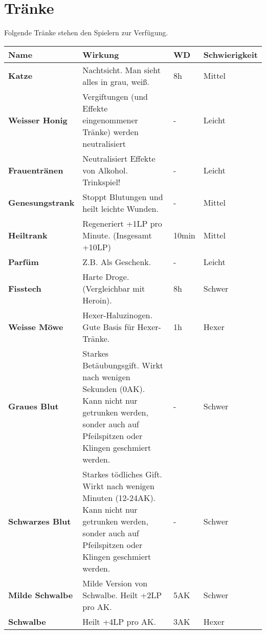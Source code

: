 \section{Tränke}
Folgende Tränke stehen den Spielern zur Verfügung. 

\begin{tabular}{|p{3.5cm}|p{7cm}|p{1.5cm}|p{3cm}|}
\hline
\textbf{Name} & \textbf{Wirkung} & \textbf{WD} & \textbf{Schwierigkeit} \\

\hline
\textbf{Katze} & Nachtsicht. Man sieht alles in grau, weiß. & 8h & Mittel \\

\hline
\textbf{Weisser Honig} & Vergiftungen (und Effekte eingenommener Tränke) werden neutralisiert & - & Leicht \\

\hline
\textbf{Frauentränen} & Neutralisiert Effekte von Alkohol. Trinkspiel! & - & Leicht \\

\hline
\textbf{Genesungstrank} & Stoppt Blutungen und heilt leichte Wunden. & - & Mittel \\

\hline
\textbf{Heiltrank} & Regeneriert +1LP pro Minute. (Insgesamt +10LP) & 10min & Mittel \\

\hline
\textbf{Parfüm} & Z.B. Als Geschenk. & - & Leicht \\

\hline
\textbf{Fisstech} & Harte Droge. (Vergleichbar mit Heroin).  & 8h & Schwer \\

\hline
\textbf{Weisse Möwe} & Hexer-Haluzinogen. Gute Basis für Hexer-Tränke. & 1h & Hexer \\

\hline
\textbf{Graues Blut} & Starkes Betäubungsgift. Wirkt nach wenigen Sekunden (0AK). Kann nicht nur getrunken werden, sonder auch auf Pfeilspitzen oder Klingen geschmiert werden. & - & Schwer \\

\hline
\textbf{Schwarzes Blut} & Starkes tödliches Gift. Wirkt nach wenigen Minuten (12-24AK). Kann nicht nur getrunken werden, sonder auch auf Pfeilspitzen oder Klingen geschmiert werden. & - & Schwer \\

\hline
\textbf{Milde Schwalbe} & Milde Version von Schwalbe. Heilt +2LP pro AK. & 5AK & Schwer \\

\hline
\textbf{Schwalbe} & Heilt +4LP pro AK. & 3AK & Hexer \\

\hline
\end{tabular}



